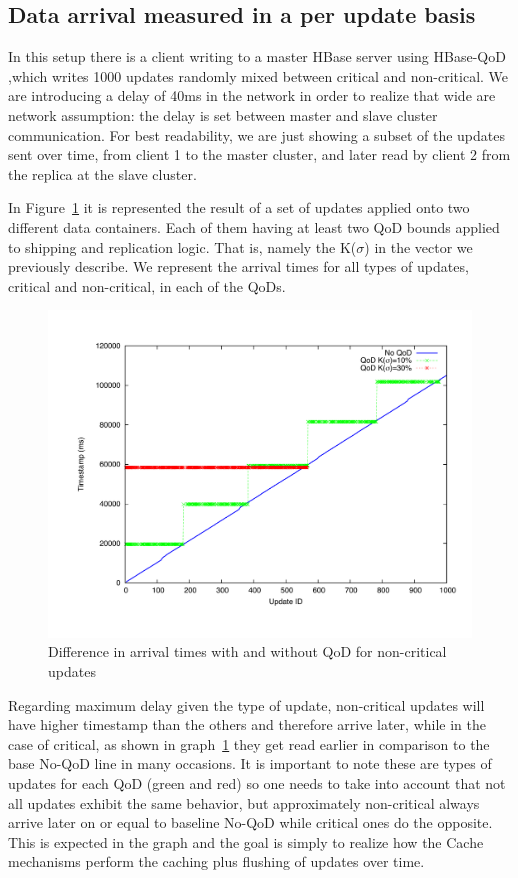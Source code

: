 \subsection{Data arrival measured in a per update basis}
In this setup there is a client writing to a master HBase server using HBase-QoD ,which writes 1000 updates randomly mixed between critical and non-critical. We are introducing a delay of 40ms in the network in order to realize that wide are network assumption: the delay is set between master and slave cluster communication. For best readability, we are just showing a subset of the updates sent over time, from client 1 to the master cluster, and later read by client 2 from the replica at the slave cluster.

In Figure~\ref{fig-baseline-critical-vs-non-critical} it is represented the result of a set of updates applied onto two different data containers. Each of them having at least two QoD bounds applied to shipping and replication logic. That is, namely the K($\sigma$) in the vector we previously describe. We represent the arrival times for all types of updates, critical and non-critical, in each of the QoDs.

\begin{figure}[h]
\centering
\includegraphics[width=1.0\textwidth]{figs/timestamps-non-critical-updates-false.pdf}
\caption{Difference in arrival times with and without QoD for non-critical updates}
\label{fig-baseline-critical-vs-non-critical}
\end{figure}

Regarding maximum delay given the type of update, non-critical updates will have higher timestamp than the others and therefore arrive later, while in the case of critical, as shown in graph~\ref{fig-baseline-critical-vs-non-critical} they get read earlier in comparison to the base No-QoD line in many occasions. It is important to note these are types of updates for each QoD (green and red) so one needs to take into account that not all updates exhibit the same behavior, but approximately non-critical always arrive later on or equal to baseline No-QoD while critical ones do the opposite. This is expected in the graph and the goal is simply to realize how the Cache mechanisms perform the caching plus flushing of updates over time.

